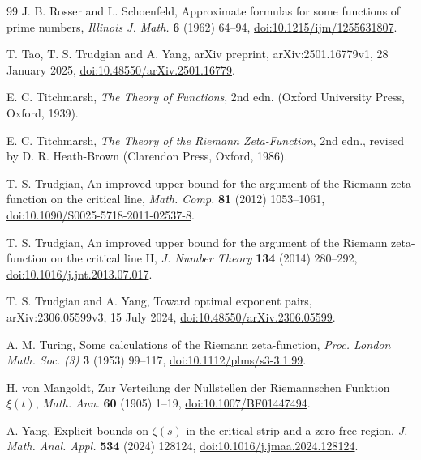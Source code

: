 \documentclass[11pt,reqno]{amsart}
\numberwithin{equation}{section}
\theoremstyle{definition}
\theoremstyle{remark}
\begin{document}
\begin{thebibliography}{99}
 J. B. Rosser and L. Schoenfeld, Approximate formulas for some functions of prime numbers, \textit{Illinois J. Math.} \textbf{6} (1962) 64--94, \href{https://doi.org/10.1215/ijm/1255631807}{doi:10.1215/ijm/1255631807}.

 T. Tao, T. S. Trudgian and A. Yang, arXiv preprint, arXiv:2501.16779v1, 28 January 2025, \href{https://doi.org/10.48550/arXiv.2501.16779}{doi:10.48550/arXiv.2501.16779}.

 E. C. Titchmarsh, \textit{The Theory of Functions}, 2nd edn. (Oxford University Press, Oxford, 1939).

 E. C. Titchmarsh, \textit{The Theory of the Riemann Zeta-Function}, 2nd edn., revised by D. R. Heath-Brown (Clarendon Press, Oxford, 1986).

 T. S. Trudgian, An improved upper bound for the argument of the Riemann zeta-function on the critical line, \textit{Math. Comp.} \textbf{81} (2012) 1053--1061, \href{https://doi.org/10.1090/S0025-5718-2011-02537-8}{doi:10.1090/S0025-5718-2011-02537-8}.

 T. S. Trudgian, An improved upper bound for the argument of the Riemann zeta-function on the critical line II, \textit{J. Number Theory} \textbf{134} (2014) 280--292, \href{https://doi.org/10.1016/j.jnt.2013.07.017}{doi:10.1016/j.jnt.2013.07.017}.

 T. S. Trudgian and A. Yang, Toward optimal exponent pairs, arXiv:2306.05599v3, 15 July 2024, \href{https://doi.org/10.48550/arXiv.2306.05599}{doi:10.48550/arXiv.2306.05599}.

 A. M. Turing, Some calculations of the Riemann zeta-function, \textit{Proc. London Math. Soc. (3)} \textbf{3} (1953) 99--117, \href{https://doi.org/10.1112/plms/s3-3.1.99}{doi:10.1112/plms/s3-3.1.99}.

 H. von Mangoldt, Zur Verteilung der Nullstellen der Riemannschen Funktion $\xi(t)$, \textit{Math. Ann.} \textbf{60} (1905) 1--19, \href{https://doi.org/10.1007/BF01447494}{doi:10.1007/BF01447494}.

 A. Yang, Explicit bounds on $\zeta(s)$ in the critical strip and a zero-free region, \textit{J. Math. Anal. Appl.} \textbf{534} (2024) 128124, \href{https://doi.org/10.1016/j.jmaa.2024.128124}{doi:10.1016/j.jmaa.2024.128124}.

\end{thebibliography}
\end{document}
